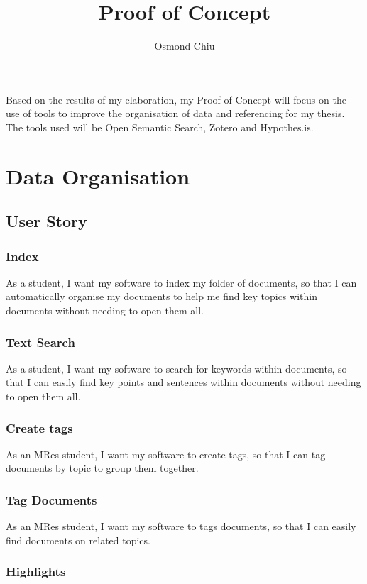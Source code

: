 \documentclass{article}
\title{Proof of Concept}
\author{Osmond Chiu}
\begin{document}
\maketitle

Based on the results of my elaboration, my Proof of Concept will focus on the use of tools to improve the organisation of data and referencing for my thesis. The tools used will be Open Semantic Search, Zotero and Hypothes.is.

\section*{Data Organisation}
\subsection*{User Story}
\subsubsection*{Index}

As a student, I want my software to index my folder of documents, so that I can automatically organise my documents to help me find key topics within documents without needing to open them all.

\subsubsection*{Text Search}

As a student, I want my software to search for keywords within documents, so that I can easily find key points and sentences within documents without needing to open them all.

\subsubsection*{Create tags}

As an MRes student, I want my software to create tags, so that I can tag documents by topic to group them together.

\subsubsection*{Tag Documents}

As an MRes student, I want my software to tags documents, so that I can easily find documents on related topics.

\subsubsection*{Highlights}
\end{document}
